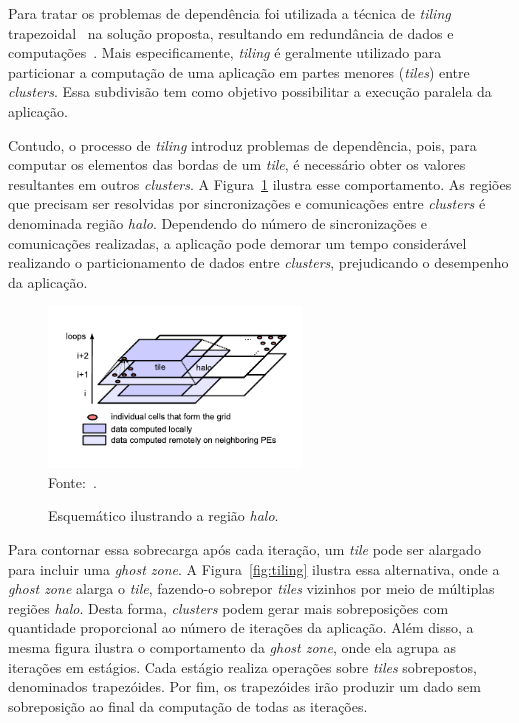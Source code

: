 Para tratar os problemas de dependência foi utilizada a técnica de
\textit{tiling} trapezoidal~\cite{meng11} na solução proposta, resultando em redundância de
dados e computações~\cite{rocha17}. Mais especificamente, \textit{tiling} é
geralmente utilizado para particionar a computação de uma aplicação \stencil em
partes menores (\textit{tiles}) entre \textit{clusters}. Essa subdivisão
tem como objetivo possibilitar a execução paralela da aplicação.

Contudo, o processo de \textit{tiling} introduz problemas de dependência, pois,
para computar os elementos das bordas de um \textit{tile}, é necessário obter
os valores resultantes em outros \textit{clusters}. A Figura~\ref{fig:tilingHalo} ilustra
esse comportamento. As regiões que precisam ser resolvidas por sincronizações e
comunicações entre \textit{clusters} é denominada região \textit{halo}. Dependendo do número
de sincronizações e comunicações realizadas, a aplicação pode demorar um tempo
considerável realizando o particionamento de dados entre \textit{clusters}, prejudicando o
desempenho da aplicação.

\begin{figure}[!h]
	\centering
    \caption{Esquemático ilustrando a região \textit{halo}.}
    \includegraphics[width=0.6\textwidth]{figs/tilingHalo.pdf} \\
    Fonte:~\cite{meng11}.
    \label{fig:tilingHalo}
\end{figure}



Para contornar essa sobrecarga após cada iteração, um \textit{tile} pode ser
alargado para incluir uma \textit{ghost zone}. A Figura~\ref{fig:tiling} ilustra
essa alternativa, onde a \textit{ghost zone} alarga o \textit{tile}, fazendo-o
sobrepor \textit{tiles} vizinhos por meio de múltiplas regiões \textit{halo}.
Desta forma, \textit{clusters} podem gerar mais sobreposições com quantidade proporcional ao
número de iterações da aplicação. Além disso, a mesma figura ilustra o
comportamento da \textit{ghost zone}, onde ela agrupa as iterações em estágios.
Cada estágio realiza operações sobre \textit{tiles} sobrepostos, denominados
trapezóides. Por fim, os trapezóides irão produzir um dado sem sobreposição ao
final da computação de todas as iterações.

